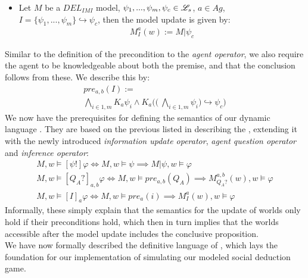 \begin{itemize}
	\item Let $M$ be a $DEL_{IMI}$ model, $\psi_1,...,\psi_m, \psi_c \in \mathscr{L}_s$,
	      $a\in Ag$, $I=\{\psi_1,...,\psi_m\} \hookrightarrow \psi_c$, then the model
	      update is given by:
	      \begin{gather}
		      M^a_I(w) := M|\psi_c
	      \end{gather}
\end{itemize}
Similar to the definition of the precondition to the \textit{agent operator}, we also require the agent to be knowledgeable about both the premise, and that the conclusion follows from these. We describe this by:
\begin{gather}
	\nonumber pre_{a,b}(I) := \\ \bigwedge\limits_{i\in1,m}K_a\psi_i \land K_a\Biggl(\Biggl(\:\bigwedge\limits_{i\in 1,m}\psi_i\Biggr) \hookrightarrow \psi_c \Biggr)
\end{gather}
We now have the prerequisites for defining the semantics of our dynamic language \dynlang. They are based on the previous listed in  describing the \staticlang, extending it with the newly introduced \textit{information update operator}, \textit{agent question operator} and \textit{inference operator}:
\begin{gather}
	M, w \models [\psi!]\varphi \iff M, w \models \psi \implies M|\psi, w \models \varphi \\
	M, w \models [Q_A?]_{a,b}\varphi \iff M, w \models pre_{a,b}(Q_A) \implies M^{a,b}_{Q_A?}(w), w \models \varphi \\
	M, w \models [I]_a\varphi \iff M, w \models pre_a(i) \implies M^a_I(w), w \models \varphi
\end{gather}
Informally, these simply explain that the semantics for the update of worlds only hold if their preconditions hold, which then in turn implies that the worlds accessible after the model update includes the conclusive proposition. \\

We have now formally described the definitive language of \dynlang, which lays
the foundation for our implementation of simulating our modeled social
deduction game.

